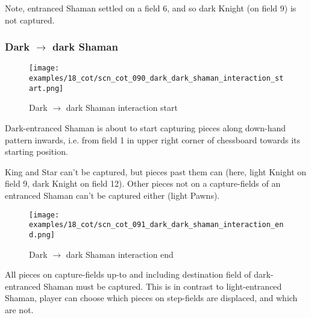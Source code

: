 Note, entranced Shaman settled on a field 6, and so dark Knight (on field 9) is not
captured.

\clearpage %

\subsubsection*{Dark $\rightarrow$ dark Shaman}
\label{sec:Conquest of Tlalocan/Trance-journey/Interactions/Dark --> dark Shaman}

\vspace*{-1.5\baselineskip}
\noindent
\begin{figure}[!h]
\texttt{[image: examples/18\_cot/scn\_cot\_090\_dark\_dark\_shaman\_interaction\_start.png]}
\vspace*{-1.4\baselineskip}
\caption{Dark $\rightarrow$ dark Shaman interaction start}
\label{fig:scn_cot_090_dark_dark_shaman_interaction_start}
\end{figure}

\vspace*{-0.5\baselineskip}
Dark-entranced Shaman is about to start capturing pieces along down-hand pattern
inwards, i.e. from field 1 in upper right corner of chessboard towards its starting
position.

King and Star can't be captured, but pieces past them can (here, light Knight on
field 9, dark Knight on field 12). Other pieces not on a capture-fields of an
entranced Shaman can't be captured either (light Pawns).

\clearpage %

\noindent
\begin{figure}[!h]
\texttt{[image: examples/18\_cot/scn\_cot\_091\_dark\_dark\_shaman\_interaction\_end.png]}
\caption{Dark $\rightarrow$ dark Shaman interaction end}
\label{fig:scn_cot_091_dark_dark_shaman_interaction_end}
\end{figure}

All pieces on capture-fields up-to and including destination field of dark-entranced
Shaman must be captured. This is in contrast to light-entranced Shaman, player can
choose which pieces on step-fields are displaced, and which are not.

